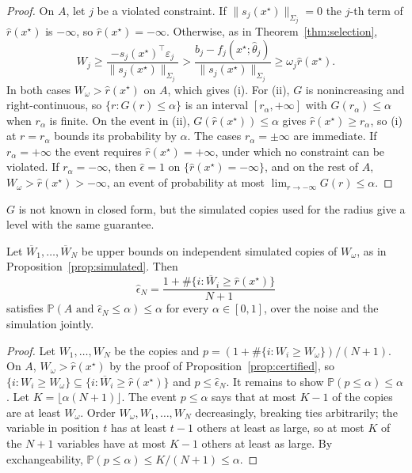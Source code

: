 \begin{proof}
On $A$, let $j$ be a violated constraint. If $\|s_j(x^\star)\|_{\Sigma_j} = 0$
the $j$-th term of $\hat r(x^\star)$ is $-\infty$, so
$\hat r(x^\star) = -\infty$. Otherwise, as in Theorem~\ref{thm:selection},
\[
  W_j \ge \frac{-s_j(x^\star)^\top\varepsilon_j}{\|s_j(x^\star)\|_{\Sigma_j}}
  > \frac{b_j - f_j(x^\star;\hat\theta_j)}{\|s_j(x^\star)\|_{\Sigma_j}}
  \ge \omega_j \hat r(x^\star) .
\]
In both cases $W_\omega > \hat r(x^\star)$ on
$A$, which gives (i). For (ii), $G$ is nonincreasing and right-continuous, so
$\{r : G(r) \le \alpha\}$ is an interval $[r_\alpha, +\infty]$ with
$G(r_\alpha) \le \alpha$ when $r_\alpha$ is finite. On the event in (ii),
$G(\hat r(x^\star)) \le \alpha$ gives $\hat r(x^\star) \ge r_\alpha$, so (i)
at $r = r_\alpha$ bounds its probability by $\alpha$. The cases
$r_\alpha = \pm\infty$ are immediate. If $r_\alpha = +\infty$ the event
requires $\hat r(x^\star) = +\infty$, under which no constraint can be
violated. If $r_\alpha = -\infty$, then $\hat\epsilon = 1$ on
$\{\hat r(x^\star) = -\infty\}$, and on the rest of $A$,
$W_\omega > \hat r(x^\star) > -\infty$, an event of probability at most
$\lim_{r \to -\infty} G(r) \le \alpha$.
\end{proof}

$G$ is not known in closed form, but the simulated copies used for the radius
give a level with the same guarantee.

\begin{corollary}\label{cor:sim-level}
Let $\overline W_1,\dots,\overline W_N$ be upper bounds on independent
simulated copies of $W_\omega$, as in Proposition~\ref{prop:simulated}. Then
\[
  \hat\epsilon_N = \frac{1 + \#\{i : \overline W_i \ge \hat r(x^\star)\}}{N+1}
\]
satisfies $\mathbb{P}(A \text{ and } \hat\epsilon_N \le \alpha) \le \alpha$
for every $\alpha \in [0,1]$, over the noise and the simulation jointly.
\end{corollary}

\begin{proof}
Let $W_1,\dots,W_N$ be the copies and
$p = (1 + \#\{i : W_i \ge W_\omega\})/(N+1)$. On $A$,
$W_\omega > \hat r(x^\star)$ by the proof of
Proposition~\ref{prop:certified}, so
$\{i : W_i \ge W_\omega\} \subseteq \{i : \overline W_i \ge \hat r(x^\star)\}$
and $p \le \hat\epsilon_N$. It remains to show
$\mathbb{P}(p \le \alpha) \le \alpha$. Let $K = \lfloor \alpha(N+1) \rfloor$.
The event $p \le \alpha$ says that at most $K - 1$ of the copies are at least
$W_\omega$. Order $W_\omega, W_1,\dots,W_N$ decreasingly, breaking ties
arbitrarily; the variable in position $t$ has at least $t - 1$ others at least
as large, so at most $K$ of the $N+1$ variables have at most $K-1$ others at
least as large. By exchangeability,
$\mathbb{P}(p \le \alpha) \le K/(N+1) \le \alpha$.
\end{proof}

